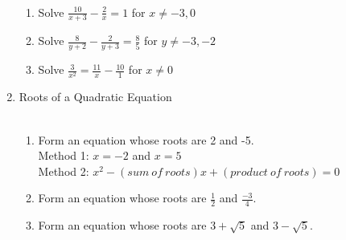 \documentclass[a4paper,14pt]{extarticle}
\begin{document}
\begin{enumerate}
\noindent{}\\[3pt]

\begin{enumerate}
\item {Solve $\frac{10}{x + 3} - \frac{2}{x} = 1$ for $x \ne -3, 0$} 
\vspace{10cm}

\item {Solve $\frac{8}{y + 2} - \frac{2}{y + 3} = \frac{8}{5}$ for $y \ne -3, -2$} 
\vspace{10cm}

\item {Solve $\frac{3}{x^2} = \frac{11}{x} - \frac{10}{1}$ for $x \ne 0$} 
\newpage
\end{enumerate}

\item Roots of a Quadratic Equation\\[4pt]

\noindent{}\\[3pt]

\begin{enumerate}
\item{Form an equation whose roots are 2 and -5.\\
Method 1: $x = -2$ and $x = 5$\\
Method 2: $x^2 - (sum\:of\:roots)x + (product\:of\:roots) = 0$\\}
\newpage

\item{Form an equation whose roots are $\frac{1}{2}$ and $\frac{-3}{4}$.}
\vspace{10cm}

\item{Form an equation whose roots are $3 + \sqrt{5}$ and $3 - \sqrt{5}$.}
\newpage


\end{enumerate}
\end{enumerate}
\end{document}
